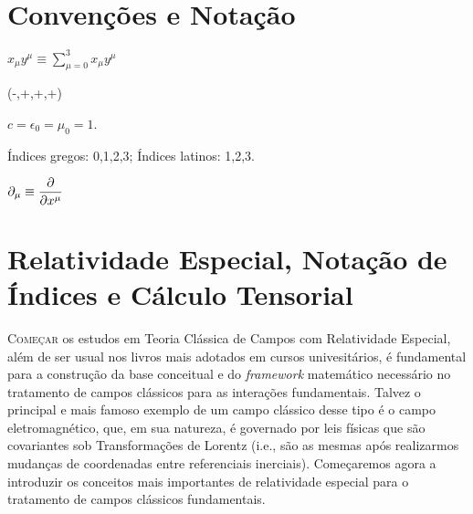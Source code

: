 \documentclass[12pt,a4paper]{article}
\begin{document}
\newpage

\section*{Convenções e Notação}\label{Conv_e_Not}


\begin{description}[
    font=\bfseries,       %
    style=unboxed,          %
    leftmargin=4.5cm,       %
    labelsep=1cm            %
]
    \item[Soma de Einstein] \hspace{0.2cm}$\displaystyle x_{\mu}y^{\mu} \equiv \sum_{\mu=0}^{3}x_{\mu}y^{\mu}$
    
    \item[Assinatura] \hspace{1.6cm}(-,+,+,+)
    
    \item[Unidades Naturais] $c = \epsilon_0 = \mu_0 = 1$.
    
    \item[Índices] \hspace{2.4cm}Índices gregos: 0,1,2,3; Índices latinos: 1,2,3.
    \item[Derivadas Parciais] $\displaystyle \partial_{\mu} \equiv \pdv{}{x^{\mu}}$ 
  \end{description}

\newpage

\tableofcontents %
\newpage %

\section{Relatividade Especial, Notação de Índices e Cálculo Tensorial}

\lettrine[lines=3, nindent=0.1em]{\capitular{}C}{omeçar} os estudos
em Teoria Clássica de Campos com Relatividade Especial, além de ser usual nos livros mais adotados
em cursos univesitários, é fundamental para a construção da base conceitual e do \textit{framework}
matemático necessário no tratamento de campos clássicos para as interações fundamentais.
Talvez o principal e mais famoso exemplo de um campo clássico desse tipo é o campo eletromagnético, que,
em sua natureza, é governado por leis físicas que são covariantes sob Transformações de Lorentz
(i.e., são as mesmas após realizarmos mudanças de coordenadas entre referenciais inerciais).
Começaremos agora a introduzir os conceitos mais importantes de relatividade especial para o tratamento de
campos clássicos fundamentais.
\end{document}
